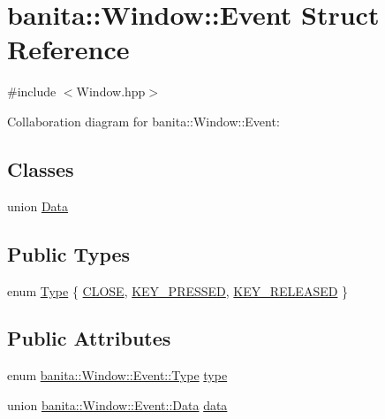 \hypertarget{structbanita_1_1_window_1_1_event}{}\section{banita\+::Window\+::Event Struct Reference}
\label{structbanita_1_1_window_1_1_event}


{\ttfamily \#include $<$Window.\+hpp$>$}



Collaboration diagram for banita\+::Window\+::Event\+:
\subsection*{Classes}
\begin{DoxyCompactItemize}
\item 
union \mbox{\hyperlink{unionbanita_1_1_window_1_1_event_1_1_data}{Data}}
\end{DoxyCompactItemize}
\subsection*{Public Types}
\begin{DoxyCompactItemize}
\item 
enum \mbox{\hyperlink{structbanita_1_1_window_1_1_event_a9124fe8193c7ed78b96220363ce692c3}{Type}} \{ \mbox{\hyperlink{structbanita_1_1_window_1_1_event_a9124fe8193c7ed78b96220363ce692c3a65bab3c2fe8ee38573749bba577b5486}{C\+L\+O\+SE}}, 
\mbox{\hyperlink{structbanita_1_1_window_1_1_event_a9124fe8193c7ed78b96220363ce692c3a2d56fe4635e732f310e356891ea68d41}{K\+E\+Y\+\_\+\+P\+R\+E\+S\+S\+ED}}, 
\mbox{\hyperlink{structbanita_1_1_window_1_1_event_a9124fe8193c7ed78b96220363ce692c3ab674d26e557bc61004bb4075a8141943}{K\+E\+Y\+\_\+\+R\+E\+L\+E\+A\+S\+ED}}
 \}
\end{DoxyCompactItemize}
\subsection*{Public Attributes}
\begin{DoxyCompactItemize}
\item 
enum \mbox{\hyperlink{structbanita_1_1_window_1_1_event_a9124fe8193c7ed78b96220363ce692c3}{banita\+::\+Window\+::\+Event\+::\+Type}} \mbox{\hyperlink{structbanita_1_1_window_1_1_event_a465ac3171aa3d833333b37c4d2d5fff7}{type}}
\item 
union \mbox{\hyperlink{unionbanita_1_1_window_1_1_event_1_1_data}{banita\+::\+Window\+::\+Event\+::\+Data}} \mbox{\hyperlink{structbanita_1_1_window_1_1_event_a1b8d8286e719931337c294db3fd49b11}{data}}
\end{DoxyCompactItemize}


